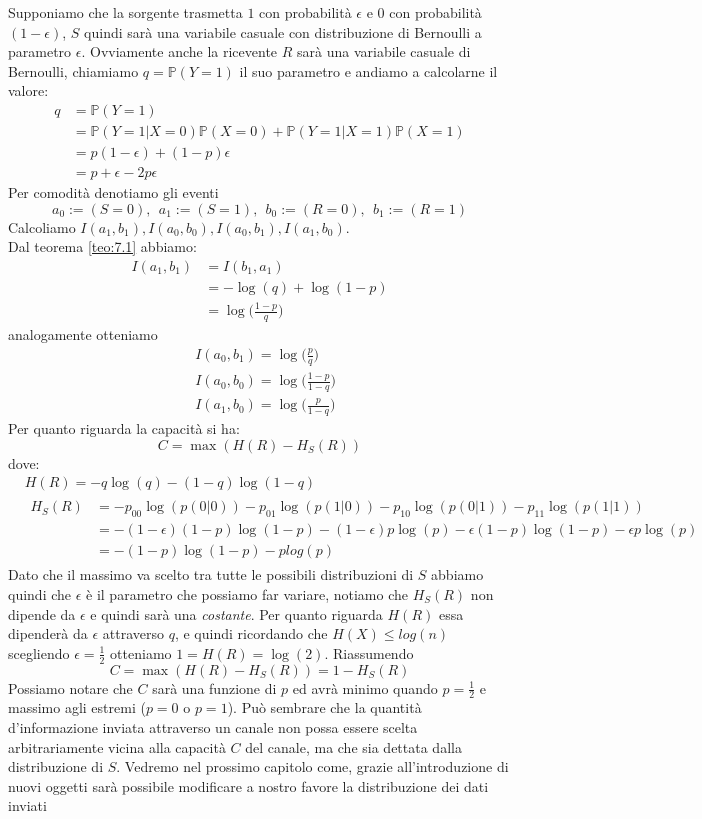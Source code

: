 \begin{oss}
Supponiamo che la sorgente trasmetta $1$ con probabilità $\epsilon$ e $0$ con probabilità $(1- \epsilon)$, $S$ quindi sarà una variabile casuale con distribuzione di Bernoulli a parametro $\epsilon$. Ovviamente anche la ricevente $R$ sarà una variabile casuale di Bernoulli, chiamiamo $q=\mathbb{P}(Y=1)$ il suo parametro e andiamo a calcolarne il valore:
\[
\begin{split}
q & =\mathbb{P}(Y=1)\\
&=\mathbb{P}(Y=1|X=0)\mathbb{P}(X=0)+\mathbb{P}(Y=1|X=1)\mathbb{P}(X=1)\\
&=p (1-\epsilon) + (1-p)\epsilon\\
&= p + \epsilon -2p\epsilon
\end{split}
\]
Per comodità denotiamo gli eventi
$$a_0:=(S=0),\ \ a_1:=(S=1),\ \ b_0:=(R=0),\  \ b_1:=(R=1)$$
Calcoliamo $I(a_1,b_1),I(a_0,b_0),I(a_0,b_1),I(a_1,b_0)$.\\
Dal teorema \ref{teo:7.1} abbiamo:
\[
\begin{split}
I(a_1,b_1)& = I(b_1,a_1) \\
&=-\log(q)+\log(1-p)\\
&=\log \bigg( \frac{1-p}{q} \bigg)
\end{split}
\]
analogamente otteniamo
\[
\begin{split}
& I(a_0,b_1)=\log \bigg( \frac{p}{q} \bigg)\\
& I(a_0,b_0)=\log \bigg( \frac{1-p}{1-q} \bigg)\\
& I(a_1,b_0)=\log \bigg( \frac{p}{1-q} \bigg)
\end{split}
\]
Per quanto riguarda la capacità si ha:
$$C=\max(H(R)-H_S(R))$$
dove:
\[
\begin{split}
&H(R)=-q \log(q)-(1-q)\log(1-q) \\
& \begin{split}
H_S(R) & = - p_{00} \log(p(0|0)) - p_{01} \log(p(1|0)) -p_{10} \log(p(0|1)) -p_{11} \log(p(1|1)) \\
& = -(1-\epsilon)(1-p) \log (1-p)- (1- \epsilon)p \log (p)- \epsilon (1-p)\log(1-p)- \epsilon p \log (p)\\
&= - (1-p) \log (1-p)- p log(p)
\end{split}
\end{split}
\]
Dato che il massimo va scelto tra tutte le possibili distribuzioni di $S$ abbiamo quindi che $\epsilon$ è il parametro che possiamo far variare, notiamo che $H_S(R)$ non dipende da $\epsilon$ e quindi sarà una \textit{costante}. Per quanto riguarda $H(R)$ essa dipenderà da $\epsilon$ attraverso $q$, e quindi ricordando che $H(X)\leq log(n)$ scegliendo $\epsilon= \frac{1}{2}$ otteniamo $1=H(R)=\log(2)$. Riassumendo
$$C=\max(H(R)-H_S(R))=1-H_S(R)$$
Possiamo notare che $C$ sarà una funzione di $p$ ed avrà minimo quando $p=\frac{1}{2}$ e massimo agli estremi ($p=0$ o $p=1$).
Può sembrare che la quantità d'informazione inviata attraverso un canale non possa essere scelta arbitrariamente vicina alla capacità $C$ del canale, ma che sia dettata dalla distribuzione di $S$. Vedremo nel prossimo capitolo come, grazie all'introduzione di nuovi oggetti sarà possibile modificare a nostro favore la distribuzione dei dati inviati
\end{oss}
